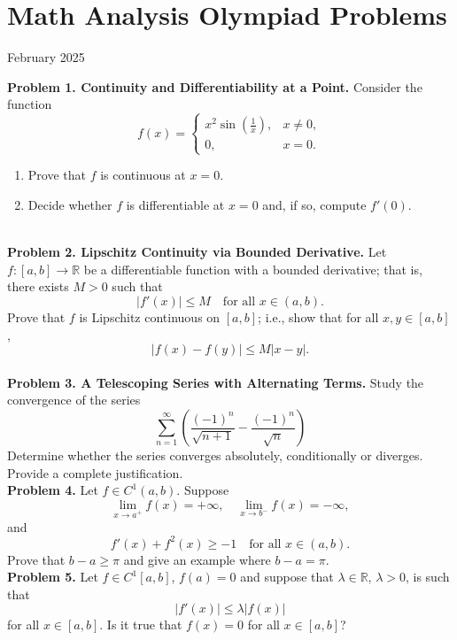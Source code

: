 \documentclass{article}
\begin{document}
\pagestyle{plain}

\section*{Math Analysis Olympiad Problems}

\begin{center}
February 2025
\end{center}

\textbf{Problem 1. Continuity and Differentiability at a Point.}
Consider the function
\[
f(x) = \begin{cases}
x^2 \sin\left(\frac{1}{x}\right), & x\neq 0, \\
0, & x=0.
\end{cases}
\]
\begin{enumerate}
    \item Prove that \(f\) is continuous at \(x=0\).
    \item Decide whether \(f\) is differentiable at \(x=0\) and, if so, compute \(f'(0)\).
\end{enumerate}
\\

\textbf{Problem 2. Lipschitz Continuity via Bounded Derivative.}
Let \(f:[a,b]\to \mathbb{R}\) be a differentiable function with a bounded derivative; that is, there exists \(M>0\) such that
\[
    |f'(x)| \le M \quad \text{for all } x \in (a,b).
\]
Prove that \(f\) is Lipschitz continuous on \([a,b]\); i.e., show that for all \(x,y\in [a,b]\),
\[
    |f(x)-f(y)| \le M |x-y|.
\]
\\

\textbf{Problem 3. A Telescoping Series with Alternating Terms.}
Study the convergence of the series
    \[
    \sum_{n=1}^\infty \left( \frac{(-1)^n}{\sqrt{n+1}} - \frac{(-1)^n}{\sqrt{n}} \right)
    \]
Determine whether the series converges absolutely, conditionally or diverges.
Provide a complete justification.
\\

\textbf{Problem 4.}
Let $f \in C^1(a,b)$. Suppose
\[
\lim_{x \to a^+} f(x) = +\infty,
\quad
\lim_{x \to b^-} f(x) = -\infty,
\]
and
\[
  f'(x) + f^2(x) \ge -1
\quad
\text{for all } x \in (a,b).
\]
Prove that $b-a \geq \pi$ and give an example where $b-a = \pi$.
\\

\textbf{Problem 5.}
Let \( f \in C^1[a,b] \), \( f(a) = 0 \) and suppose that \( \lambda \in \mathbb{R} \), \( \lambda > 0 \), is such that
\[
|f'(x)| \leq \lambda |f(x)|
\]
for all \( x \in [a,b] \). Is it true that \( f(x) = 0 \) for all \( x \in [a,b] \)?
\\
\end{document}
